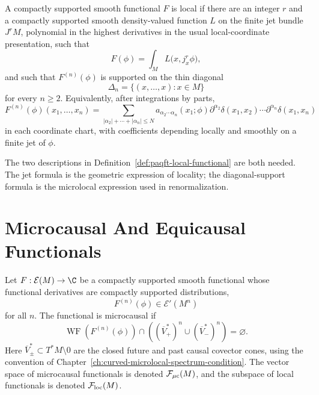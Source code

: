 \begin{definition}
\label{def:paqft-local-functional}
A compactly supported smooth functional \(F\) is local if there are an
integer \(r\) and a compactly supported smooth density-valued function \(L\)
on the finite jet bundle \(J^rM\), polynomial in the highest derivatives in
the usual local-coordinate presentation, such that
\begin{equation}
  F(\phi)=\int_M L\bigl(x,j_x^r\phi\bigr),
  \label{eq:paqft-local-functional-jet-form}
\end{equation}
and such that \(F^{(n)}(\phi)\) is supported on the thin diagonal
\[
  \Delta_n=\{(x,\ldots,x):x\in M\}
\]
for every \(n\ge2\).  Equivalently, after integrations by parts,
\begin{equation}
  F^{(n)}(\phi)(x_1,\ldots,x_n)
  =
  \sum_{|\alpha_2|+\cdots+|\alpha_n|\le N}
  a_{\alpha_2\cdots\alpha_n}(x_1;\phi)
  \partial^{\alpha_2}\delta(x_1,x_2)\cdots
  \partial^{\alpha_n}\delta(x_1,x_n)
  \label{eq:paqft-local-functional-diagonal-kernel}
\end{equation}
in each coordinate chart, with coefficients depending locally and smoothly
on a finite jet of \(\phi\).
\end{definition}

The two descriptions in Definition~\ref{def:paqft-local-functional} are
both needed.  The jet formula is the geometric expression of locality; the
diagonal-support formula is the microlocal expression used in
renormalization.

\section{Microcausal And Equicausal Functionals}

\begin{definition}
\label{def:paqft-microcausal-functional}
Let \(F:\mathcal E(M)\to\C\) be a compactly supported smooth functional
whose functional derivatives are compactly supported distributions,
\[
  F^{(n)}(\phi)\in\mathcal E'(M^n)
\]
for all \(n\).  The functional is microcausal if
\begin{equation}
  \operatorname{WF}(F^{(n)}(\phi))
  \cap
  \left((\overline V_+^*)^n\cup(\overline V_-^*)^n\right)
  =
  \varnothing .
  \label{eq:paqft-microcausal-cone-condition}
\end{equation}
Here \(\overline V_\pm^*\subset T^*M\setminus0\) are the closed future and
past causal covector cones, using the convention of
Chapter~\ref{ch:curved-microlocal-spectrum-condition}.  The vector space of
microcausal functionals is denoted \(\mathcal F_{\mu{\rm c}}(M)\), and the
subspace of local functionals is denoted \(\mathcal F_{\rm loc}(M)\).
\end{definition}

